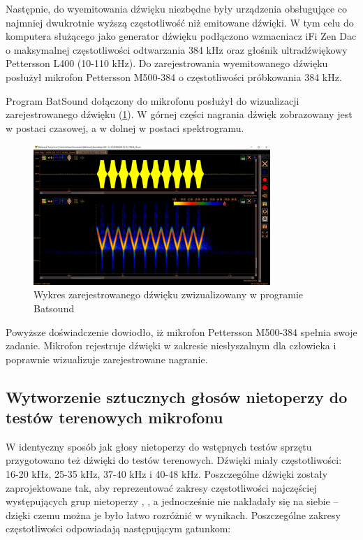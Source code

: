 \documentclass{sprz}
\begin{document}
Następnie, do wyemitowania dźwięku niezbędne były urządzenia obsługujące co najmniej dwukrotnie wyższą częstotliwość niż emitowane dźwięki. W tym celu do komputera służącego jako generator dźwięku podłączono wzmacniacz iFi Zen Dac o maksymalnej częstotliwości odtwarzania 384 kHz oraz głośnik ultradźwiękowy Pettersson L400 (10-110 kHz). Do zarejestrowania wyemitowanego dźwięku posłużył mikrofon Pettersson M500-384 o częstotliwości próbkowania 384 kHz.

Program BatSound dołączony do mikrofonu posłużył do wizualizacji zarejestrowanego dźwięku (\ref{img:batsound}). W górnej części nagrania dźwięk zobrazowany jest w postaci czasowej, a w dolnej w postaci spektrogramu.

\begin{figure}[h]
    \centering
    \includegraphics[width=0.8\textwidth]{sprz/batsound}
    \caption{Wykres zarejestrowanego dźwięku zwizualizowany w programie Batsound}
    \label{img:batsound}
\end{figure}

Powyższe doświadczenie dowiodło, iż mikrofon Pettersson M500-384 spełnia swoje zadanie. Mikrofon rejestruje dźwięki w zakresie niesłyszalnym dla człowieka i poprawnie wizualizuje zarejestrowane nagranie.

\subsection{Wytworzenie sztucznych głosów nietoperzy do testów terenowych mikrofonu}
W identyczny sposób jak głosy nietoperzy do wstępnych testów sprzętu przygotowano też dźwięki do testów terenowych. Dźwięki miały częstotliwości: 16-20 kHz, 25-35 kHz, 37-40 kHz i 40-48 kHz. Poszczególne dźwięki zostały zaprojektowane tak, aby reprezentować zakresy częstotliwości najczęściej występujących grup nietoperzy \cite{sachanowicz}, \cite{sachanowicz2}, a jednocześnie nie nakładały się na siebie – dzięki czemu można je było łatwo rozróżnić w wynikach. Poszczególne zakresy częstotliwości odpowiadają następującym gatunkom:
\end{document}
